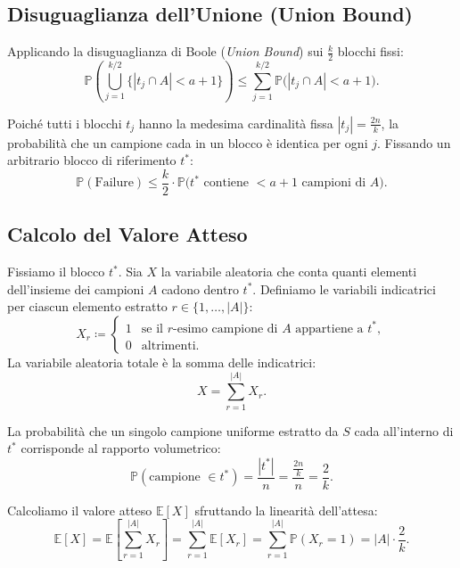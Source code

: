 \FloatBarrier
\subsection{Disuguaglianza dell'Unione (Union Bound)}
Applicando la disuguaglianza di Boole (\textit{Union Bound}) sui $\frac{k}{2}$ blocchi fissi:
\begin{equation}
  \mathbb{P}\left(\bigcup_{j=1}^{k/2} \big\{|t_j \cap A| < a + 1\big\}\right) \le \sum_{j=1}^{k/2} \mathbb{P}\big(|t_j \cap A| < a + 1\big).
\end{equation}

Poiché tutti i blocchi $t_j$ hanno la medesima cardinalità fissa $|t_j| = \frac{2n}{k}$, la probabilità che un campione cada in un blocco è identica per ogni $j$. Fissando un arbitrario blocco di riferimento $t^*$:
\begin{equation}
  \mathbb{P}(\text{Failure}) \le \frac{k}{2} \cdot \mathbb{P}\big(t^* \text{ contiene } < a + 1 \text{ campioni di } A\big).
  \label{eq:union-bound-failure}
\end{equation}

\FloatBarrier
\subsection{Calcolo del Valore Atteso}
Fissiamo il blocco $t^*$. Sia $X$ la variabile aleatoria che conta quanti elementi dell'insieme dei campioni $A$ cadono dentro $t^*$. Definiamo le variabili indicatrici per ciascun elemento estratto $r \in \{1, \dots, |A|\}$:
\begin{equation}
  X_r \coloneqq \begin{cases}
    1 & \text{se il } r\text{-esimo campione di } A \text{ appartiene a } t^*, \\
    0 & \text{altrimenti.}
  \end{cases}
\end{equation}
La variabile aleatoria totale è la somma delle indicatrici:
\begin{equation}
  X = \sum_{r=1}^{|A|} X_r.
\end{equation}

La probabilità che un singolo campione uniforme estratto da $S$ cada all'interno di $t^*$ corrisponde al rapporto volumetrico:
\begin{equation}
  \mathbb{P}(\text{campione } \in t^*) = \frac{|t^*|}{n} = \frac{\frac{2n}{k}}{n} = \frac{2}{k}.
\end{equation}

Calcoliamo il valore atteso $\mathbb{E}[X]$ sfruttando la linearità dell'attesa:
\begin{equation}
  \mathbb{E}[X] = \mathbb{E}\left[ \sum_{r=1}^{|A|} X_r \right] = \sum_{r=1}^{|A|} \mathbb{E}[X_r] = \sum_{r=1}^{|A|} \mathbb{P}(X_r = 1) = |A| \cdot \frac{2}{k}.
\end{equation}


